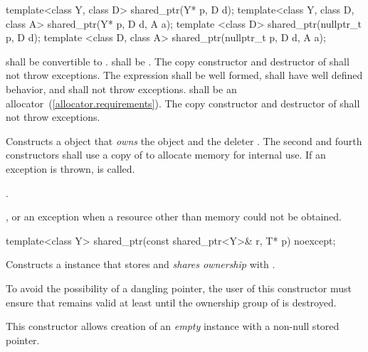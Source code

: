 %
\begin{itemdecl}
template<class Y, class D> shared_ptr(Y* p, D d);
template<class Y, class D, class A> shared_ptr(Y* p, D d, A a);
template <class D> shared_ptr(nullptr_t p, D d);
template <class D, class A> shared_ptr(nullptr_t p, D d, A a);
\end{itemdecl}

\begin{itemdescr}
\pnum\requires  {} shall be convertible to .  shall be
. The copy constructor and destructor of 
shall not throw exceptions. The expression  shall be
well formed, shall have well defined behavior, and shall not throw exceptions.
 shall be an allocator~(\ref{allocator.requirements}).
The copy constructor and destructor of  shall not throw exceptions.

\pnum\effects  Constructs a  object that \textit{owns} the
object  and the deleter .
The second and fourth constructors shall use a copy of  to
allocate memory for internal use.
If an exception is thrown,  is called.

\pnum\postconditions  {}.

\pnum\throws  {}, or an  exception
when a resource other than memory could not be obtained.
\end{itemdescr}

%
\begin{itemdecl}
template<class Y> shared_ptr(const shared_ptr<Y>& r, T* p) noexcept;
\end{itemdecl}

\begin{itemdescr}
\pnum
\effects Constructs a  instance that
stores  and \textit{shares ownership} with .

\pnum
\postconditions {}

\pnum
\enternote To avoid the possibility of a dangling pointer, the
user of this constructor must ensure that  remains valid at
least until the ownership group of  is destroyed. \exitnote

\pnum
\enternote This constructor allows creation of an \textit{empty}
 instance with a non-null stored pointer. \exitnote
\end{itemdescr}

